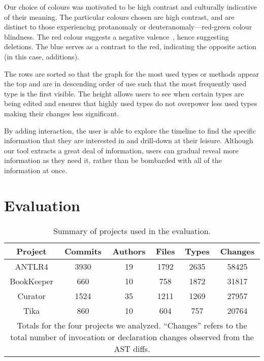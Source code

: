 Our choice of colours was motivated to be high contrast and culturally indicative of their meaning. The particular colours chosen are high contrast, and are distinct to those experiencing protanomaly or deuteranomaly---red-green colour blindness. The red colour suggests a negative valence~\cite{moller2009}, hence suggesting deletions. The blue serves as a contrast to the red, indicating the opposite action (in this case, additions).

The rows are sorted so that the graph for the most used types or methods appear the top and are in descending order of use such that the most frequently used type is the first visible. The height allows users to see when certain types are being edited and ensures that highly used types do not overpower less used types making their changes less significant.

By adding interaction, the user is able to explore the timeline to find the specific information that they are interested in and drill-down at their leisure. Although our tool extracts a great deal of information, users can gradual reveal more information as they need it, rather than be bombarded with all of the information at once.


\section{Evaluation}
\label{sec:eval}


\begin{table}[t]
\renewcommand{\arraystretch}{1.3}
\centering
\caption{Summary of projects used in the evaluation.}
\label{tab:project-summary}
\begin{tabular}{c|ccccc}
\hline
\bfseries Project & \bfseries Commits & \bfseries Authors & \bfseries Files &   \bfseries Types &  \bfseries  Changes\\
\hline
ANTLR4 & 3930 & 19 & 1792 & 2635 & 58425\\
BookKeeper & 660 & 10 & 758 & 1872 & 31817\\
Curator & 1524 & 35 & 1211 & 1269 & 27957\\
Tika & 860 & 10 & 604 & 757 & 20764\\
\hline
\multicolumn{6}{p{3.25in}}{\footnotesize Totals for the four projects we analyzed. ``Changes'' refers to the total number of invocation or declaration changes observed from the AST diffs.}
\end{tabular}
\end{table}

